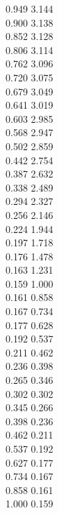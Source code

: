\documentclass{article}
\begin{document}
{  0.949 3.144 \\ 0.900 3.138 \\ 0.852 3.128 \\ 0.806 3.114 \\ 0.762 3.096 \\ 0.720 3.075 \\ 0.679 3.049 \\ 0.641 3.019 \\
  0.603 2.985 \\ 0.568 2.947 \\ 0.502 2.859 \\ 0.442 2.754 \\ 0.387 2.632 \\ 0.338 2.489 \\ 0.294 2.327 \\ 0.256 2.146 \\
  0.224 1.944 \\ 0.197 1.718 \\ 0.176 1.478 \\ 0.163 1.231 \\ 0.159 1.000 \\ 0.161 0.858 \\ 0.167 0.734 \\ 0.177 0.628 \\
  0.192 0.537 \\ 0.211 0.462 \\ 0.236 0.398 \\ 0.265 0.346 \\ 0.302 0.302 \\ 0.345 0.266 \\ 0.398 0.236 \\ 0.462 0.211 \\
  0.537 0.192 \\ 0.627 0.177 \\ 0.734 0.167 \\ 0.858 0.161 \\ 1.000 0.159 \\
}\curvaxyeB%
\end{document}
